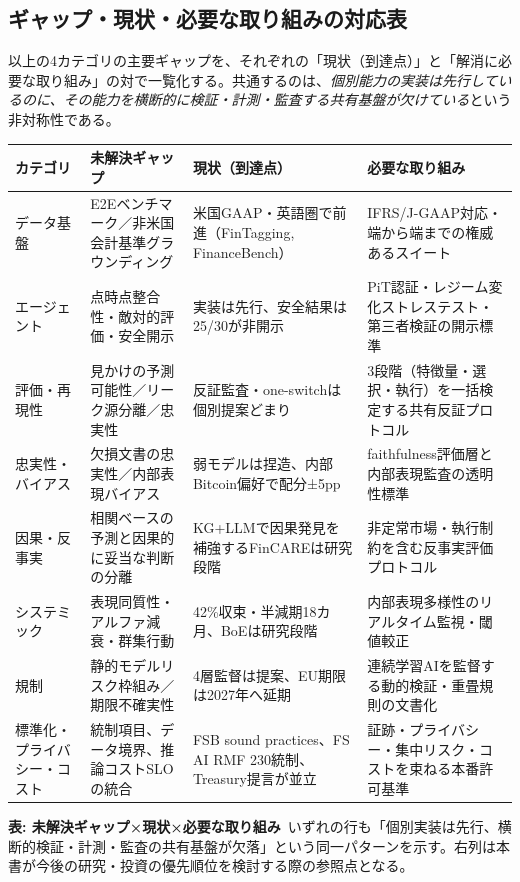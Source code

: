 \subsection{ギャップ・現状・必要な取り組みの対応表}

以上の4カテゴリの主要ギャップを、それぞれの「現状（到達点）」と「解消に必要な取り組み」の対で一覧化する。共通するのは、\emph{個別能力の実装は先行しているのに、その能力を横断的に検証・計測・監査する共有基盤が欠けている}という非対称性である。

\begin{center}
\footnotesize
\renewcommand{\arraystretch}{1.35}
\begin{tabular}{@{}p{2.0cm}p{4.3cm}p{4.3cm}p{2.6cm}@{}}
\toprule
\textbf{カテゴリ} & \textbf{未解決ギャップ} & \textbf{現状（到達点）} & \textbf{必要な取り組み} \\
\midrule
データ基盤 & E2Eベンチマーク／非米国会計基準グラウンディング & 米国GAAP・英語圏で前進（FinTagging\cite{fintagging2025}, FinanceBench\cite{financebench2023}） & IFRS/J-GAAP対応・端から端までの権威あるスイート \\
\addlinespace
エージェント & 点時点整合性・敵対的評価・安全開示 & 実装は先行、安全結果は25/30が非開示\cite{x07agentindex2026} & PiT認証・レジーム変化ストレステスト・第三者検証の開示標準 \\
\addlinespace
評価・再現性 & 見かけの予測可能性／リーク源分離／忠実性 & 反証監査\cite{x07spurious2026}・one-switch\cite{x07alphadisappears2026}は個別提案どまり & 3段階（特徴量・選択・執行）を一括検定する共有反証プロトコル \\
\addlinespace
忠実性・バイアス & 欠損文書の忠実性／内部表現バイアス & 弱モデルは捏造\cite{x07juristech2026}、内部Bitcoin偏好で配分±5pp\cite{x07assetbias2026} & faithfulness評価層と内部表現監査の透明性標準 \\
\addlinespace
因果・反事実 & 相関ベースの予測と因果的に妥当な判断の分離 & KG+LLMで因果発見を補強するFinCARE\cite{x07fincare2025}は研究段階 & 非定常市場・執行制約を含む反事実評価プロトコル \\
\addlinespace
システミック & 表現同質性・アルファ減衰・群集行動 & 42\%収束・半減期18カ月\cite{x07alphadecay2026}、BoEは研究段階\cite{x07tsc2026} & 内部表現多様性のリアルタイム監視・閾値較正 \\
\addlinespace
規制 & 静的モデルリスク枠組み／期限不確実性 & 4層監督は提案\cite{x07agenticregulator2025}、EU期限は2027年へ延期\cite{x07digitalomnibus2026} & 連続学習AIを監督する動的検証・重畳規則の文書化 \\
\addlinespace
標準化・プライバシー・コスト & 統制項目、データ境界、推論コストSLOの統合 & FSB sound practices\cite{x07fsbsound2026}、FS AI RMF 230統制\cite{x07crifsairmf2026}、Treasury提言\cite{x07treasuryai2024}が並立 & 証跡・プライバシー・集中リスク・コストを束ねる本番許可基準 \\
\bottomrule
\end{tabular}
\end{center}
{\small\color{brandgray}\textbf{表: 未解決ギャップ×現状×必要な取り組み}\ いずれの行も「個別実装は先行、横断的検証・計測・監査の共有基盤が欠落」という同一パターンを示す。右列は本書が今後の研究・投資の優先順位を検討する際の参照点となる。}

